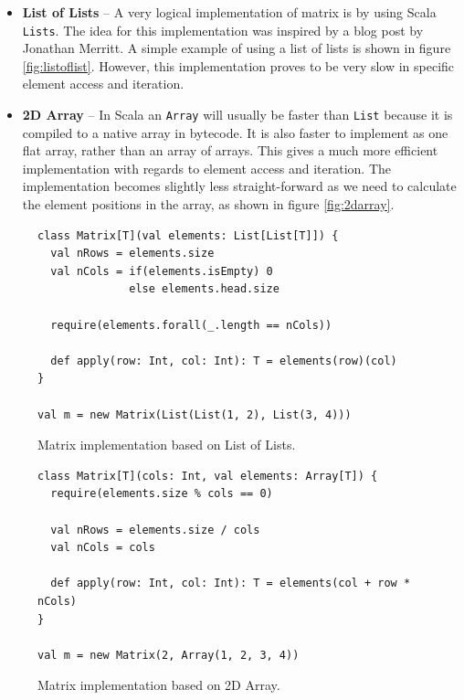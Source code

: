 \documentclass[a4paper,english]{report}
\begin{document}
\begin{itemize}
\item \textbf{List of Lists} -- A very logical implementation of
  matrix is by using Scala \texttt{Lists}. The idea for this
  implementation was inspired by a blog post by Jonathan
  Merritt\cite{mer08}. A simple example of using a list of lists is
  shown in figure \vref{fig:listoflist}. However, this implementation
  proves to be very slow in specific element access and iteration.
\item \textbf{2D Array} -- In Scala an \texttt{Array} will usually be
  faster than \texttt{List} because it is compiled to a native array
  in bytecode. It is also faster to implement as one flat array,
  rather than an array of arrays. This gives a much more efficient
  implementation with regards to element access and iteration. The
  implementation becomes slightly less straight-forward as we need to
  calculate the element positions in the array, as shown in figure
  \vref{fig:2darray}.
\end{itemize}

\begin{figure}
  \begin{lstlisting}
class Matrix[T](val elements: List[List[T]]) {
  val nRows = elements.size
  val nCols = if(elements.isEmpty) 0
              else elements.head.size

  require(elements.forall(_.length == nCols))

  def apply(row: Int, col: Int): T = elements(row)(col)
}

val m = new Matrix(List(List(1, 2), List(3, 4)))
  \end{lstlisting}
  \caption{Matrix implementation based on List of
    Lists.\label{fig:listoflist}}
\end{figure}

\begin{figure}
  \begin{lstlisting}
class Matrix[T](cols: Int, val elements: Array[T]) {
  require(elements.size % cols == 0)

  val nRows = elements.size / cols
  val nCols = cols

  def apply(row: Int, col: Int): T = elements(col + row * nCols)
}

val m = new Matrix(2, Array(1, 2, 3, 4))
  \end{lstlisting}
  \caption{Matrix implementation based on 2D
    Array.\label{fig:2darray}}
\end{figure}
\end{document}
